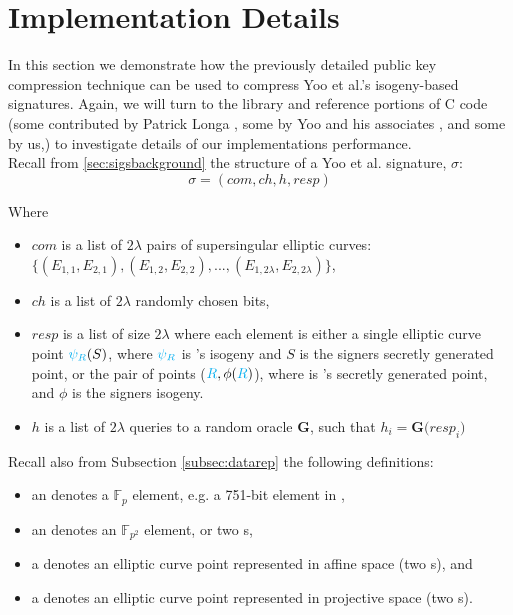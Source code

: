 \section{Implementation Details}
\label{sec:compimplementation}

In this section we demonstrate how the previously detailed public key compression technique can be used to compress Yoo et al.'s isogeny-based signatures. Again, we will turn to the \sidh library and reference portions of C code (some contributed by Patrick Longa \cite{sidhcode}, some by Yoo and his associates \cite{yoosigcode}, and some by us,) to investigate details of our implementations performance.\\

\noindent
Recall from \ref{sec:sigsbackground} the structure of a Yoo et al. signature, $\sigma$:
$$
\sigma = (com, ch, h, resp)
$$

\noindent
Where

\begin{itemize}
\item $com$ is a list of $2\lambda$ pairs of supersingular elliptic curves: $\{(E_{1,1}, E_{2,1}), (E_{1,2}, E_{2,2}), ..., (E_{1,2\lambda}, E_{2,2\lambda})\}$,
\item $ch$ is a list of $2\lambda$ randomly chosen bits,
\item $resp$ is a list of size $2\lambda$ where each element is either a single elliptic curve point $\textcolor{cyan}{\psi_R}(S)$, where $\textcolor{cyan}{\psi_R}$ is \randall's isogeny and $S$ is the signers secretly generated point, or the pair of points ($\textcolor{cyan}{R}, \phi(\textcolor{cyan}{R})$), where \cyr is \randall's secretly generated point, and $\phi$ is the signers isogeny.
\item $h$ is a list of $2\lambda$ queries to a random oracle \textbf{G}, such that $h_{i} = \textbf{G(}resp_{i}\textbf{)}$
\end{itemize}

\noindent
Recall also from Subsection \ref{subsec:datarep} the following definitions:
\begin{itemize}
\item an  denotes a $\mathbb{F}_{p}$ element, e.g. a 751-bit element in \sidh,
\item an  denotes an $\mathbb{F}_{p^2}$ element, or two s,
\item a  denotes an elliptic curve point represented in affine space (two s), and
\item a  denotes an elliptic curve point represented in projective space (two s).
\end{itemize}

